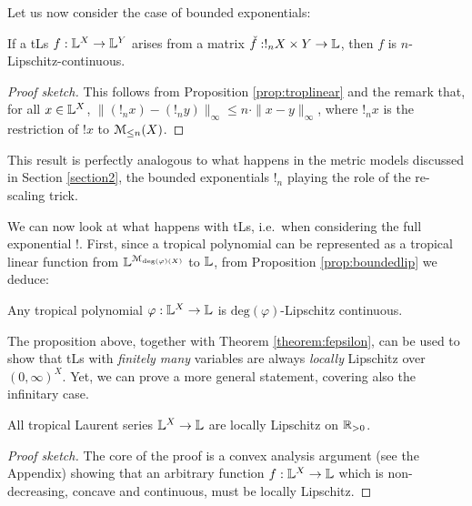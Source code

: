 Let us now consider the case of bounded exponentials:
\begin{proposition}\label{prop:boundedlip}
If a tLs $f: \mathbb{L}^{X}\to \mathbb{L}^{Y}$ arises from a matrix $\check f:!_{n}X\times Y\to \mathbb{L}$, then $f$ is $n$-Lipschitz-continuous.
\end{proposition}
\begin{proof}[Proof sketch]
This follows from Proposition \ref{prop:troplinear} and the remark that, for all $x\in \mathbb{L}^{X}$, $\| (!_{n} x)-(!_{n} y)\|_{\infty}\leq n\cdot \| x- y\|_{\infty}$, where $!_{n} x$ is the restriction of $! x$ to $\mathcal{M}_{\leq n}(X)$.%
\end{proof}
This result is perfectly analogous to what happens in the metric models discussed in Section \ref{section2}, the bounded exponentials $!_{n}$ playing the role of the re-scaling trick.

We can now look at what happens with tLs, i.e.~when considering the full exponential $!$.
First, since a tropical polynomial can be represented as a tropical linear function from $\mathbb{L}^{\mathcal{M}_{\mathrm{deg}(\varphi)(X)}}$ to $\mathbb{L}$, from Proposition \ref{prop:boundedlip} we deduce:
\begin{proposition}\label{prop:polylip}
Any tropical polynomial $\varphi:\mathbb{L}^{X}\to\mathbb{L}$ is $\mathrm{deg}(\varphi)$-Lipschitz continuous.
\end{proposition}

The proposition above, together with Theorem \ref{theorem:fepsilon}, can be used to show that tLs with \emph{finitely many} variables are always \emph{locally} Lipschitz over $(0,\infty)^{X}$. Yet, we can prove a more general statement, covering also the infinitary case.


\begin{theorem}\label{thmTLSlocLip}
 All tropical Laurent series $\mathbb{L}^X\to\mathbb{L}$ are locally Lipschitz on $\mathbb{R}_{>0}$.
\end{theorem}
\begin{proof}[Proof sketch]
The core of the proof is a convex analysis argument (see the Appendix) showing that an arbitrary function $f:\mathbb{L}^X\to\mathbb{L}$ which is non-decreasing, concave and continuous, must be locally Lipschitz. 
\end{proof}



